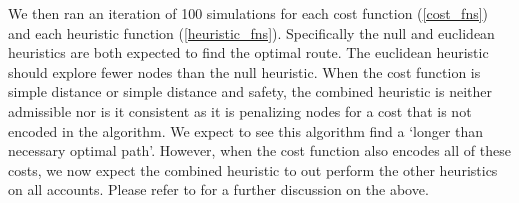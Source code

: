 \documentclass[11pt]{article}
\begin{document}
\par
We then ran an iteration of 100 simulations for each cost function (\ref{cost_fns}) and each heuristic function (\ref{heuristic_fns}). Specifically the null and euclidean heuristics are both expected to find the optimal route. The euclidean heuristic should explore fewer nodes than the null heuristic. When the cost function is simple distance or simple distance and safety, the combined heuristic is neither admissible nor is it consistent as it is penalizing nodes for a cost that is not encoded in the algorithm. We expect to see this algorithm find a `longer than necessary optimal path'. However, when the cost function also encodes all of these costs, we now expect the combined heuristic to out perform the other heuristics on all accounts. Please refer to  for a further discussion on the above.



\end{document}
